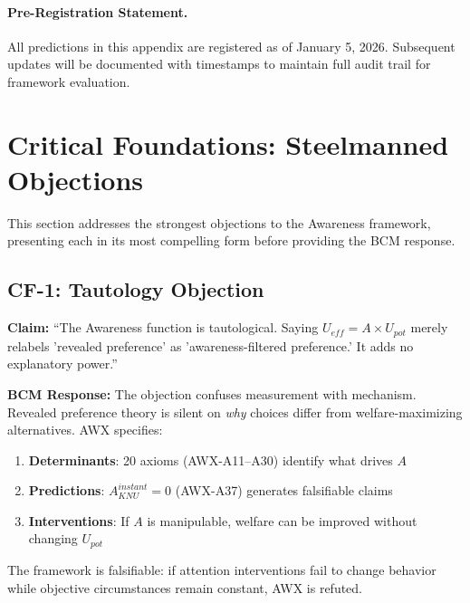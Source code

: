 \paragraph{Pre-Registration Statement.}
All predictions in this appendix are registered as of January 5, 2026.
Subsequent updates will be documented with timestamps to maintain
full audit trail for framework evaluation.


\section{Critical Foundations: Steelmanned Objections}
\label{sec:critical-foundations}

This section addresses the strongest objections to the Awareness framework, presenting each in its most compelling form before providing the BCM response.

\subsection{CF-1: Tautology Objection}

\begin{tcolorbox}[colback=red!5!white, colframe=red!75!black, title=Objection]
\textbf{Claim:} ``The Awareness function is tautological. Saying $U_{eff} = A \times U_{pot}$ merely relabels 'revealed preference' as 'awareness-filtered preference.' It adds no explanatory power.''
\end{tcolorbox}

\textbf{BCM Response:} The objection confuses measurement with mechanism. Revealed preference theory is silent on \textit{why} choices differ from welfare-maximizing alternatives. AWX specifies:
\begin{enumerate}[nosep]
    \item \textbf{Determinants}: 20 axioms (AWX-A11--A30) identify what drives $A$
    \item \textbf{Predictions}: $A_{KNU}^{instant} = 0$ (AWX-A37) generates falsifiable claims
    \item \textbf{Interventions}: If $A$ is manipulable, welfare can be improved without changing $U_{pot}$
\end{enumerate}
The framework is falsifiable: if attention interventions fail to change behavior while objective circumstances remain constant, AWX is refuted.

